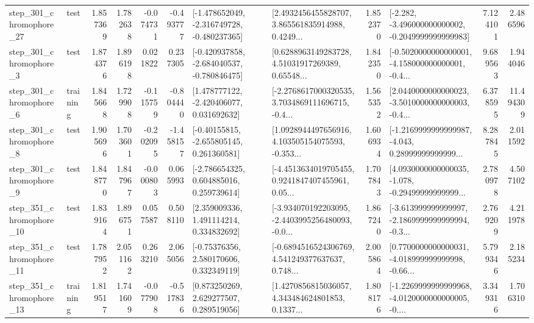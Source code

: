 \begin{tabular}{llrrrrllrlrr}
  step\_301\_chromophore\_27 &      test &      1.857369 &    1.782638 &     -0.074731 & -0.493777 &  [-1.478652049, -2.316749728, -0.480237365] &  [2.4932456455828707, 3.865561835914988, 0.4249... &       1.852370 &  [-2.282, -3.496000000000002, -0.2049999999999983] &            7.124101 &          2.486596 \\
   step\_301\_chromophore\_3 &      test &      1.874376 &    1.896198 &      0.021822 &  0.237305 &  [-0.420937858, -2.684040537, -0.780846475] &  [0.6288963149283728, 4.51031917269389, 0.65548... &       1.842350 &  [-0.5020000000000001, -4.158000000000001, -0.4... &            9.689563 &          1.944046 \\
   step\_301\_chromophore\_6 &  training &      1.845668 &    1.729908 &     -0.115759 & -0.804440 &    [1.478777122, -2.420406077, 0.031692632] &  [-2.2768617000320535, 3.7034869111696715, -0.4... &       1.565352 &  [2.0440000000000023, -3.5010000000000003, -0.4... &            6.378595 &         11.494309 \\
   step\_301\_chromophore\_8 &      test &      1.905696 &    1.703601 &     -0.202095 & -1.458157 &    [-0.40155815, -2.655805145, 0.261360581] &  [1.0928944497656916, 4.103505154075593, -0.353... &       1.606934 &  [-1.2169999999999987, -4.043, 0.28999999999999... &            8.287845 &          2.011592 \\
   step\_301\_chromophore\_9 &      test &      1.848770 &    1.847967 &     -0.000803 &  0.065993 &    [-2.786654325, 0.604885016, 0.259739614] &  [-4.4513634019705455, 0.9241847407455961, 0.05... &       1.707843 &  [4.0930000000000035, -1.078, -0.29499999999999... &            2.780978 &          4.507102 \\
  step\_351\_chromophore\_10 &      test &      1.839164 &    1.896751 &      0.057587 &  0.508110 &     [2.359009336, 1.491114214, 0.334832692] &  [-3.934070192203095, -2.4403995256480093, -0.0... &       1.867240 &  [-3.613999999999997, -2.1869999999999994, -0.3... &            2.769209 &          4.211978 \\
  step\_351\_chromophore\_11 &      test &      1.787952 &    2.051162 &      0.263210 &  2.065056 &     [-0.75376356, 2.580170606, 0.332349119] &  [-0.6894516524306769, 4.541249377637637, 0.748... &       2.005864 &  [0.7700000000000031, -4.018999999999998, -0.66... &            5.799346 &          2.185234 \\
  step\_351\_chromophore\_13 &  training &      1.819517 &    1.741609 &     -0.077908 & -0.517836 &     [0.873250269, 2.629277507, 0.289519056] &  [1.4270856815036057, 4.343484624801853, 0.1337... &       1.808176 &  [-1.2269999999999968, -4.0120000000000005, -0.... &            3.349316 &          1.706310 \\

\end{tabular}
